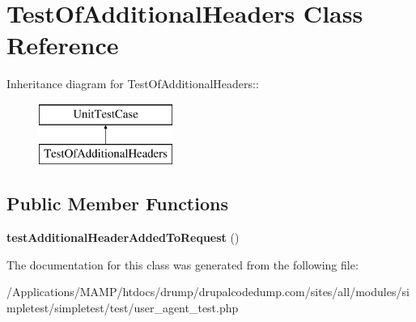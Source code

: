\hypertarget{class_test_of_additional_headers}{
\section{TestOfAdditionalHeaders Class Reference}
\label{class_test_of_additional_headers}
}
Inheritance diagram for TestOfAdditionalHeaders::\begin{figure}[H]
\begin{center}
\leavevmode
\includegraphics[height=2cm]{class_test_of_additional_headers}
\end{center}
\end{figure}
\subsection*{Public Member Functions}
\begin{DoxyCompactItemize}
\item 
\hypertarget{class_test_of_additional_headers_ab71b38e3878d18c8318f68ddf7aca49a}{
{\bfseries testAdditionalHeaderAddedToRequest} ()}
\label{class_test_of_additional_headers_ab71b38e3878d18c8318f68ddf7aca49a}

\end{DoxyCompactItemize}


The documentation for this class was generated from the following file:\begin{DoxyCompactItemize}
\item 
/Applications/MAMP/htdocs/drump/drupalcodedump.com/sites/all/modules/simpletest/simpletest/test/user\_\-agent\_\-test.php\end{DoxyCompactItemize}
